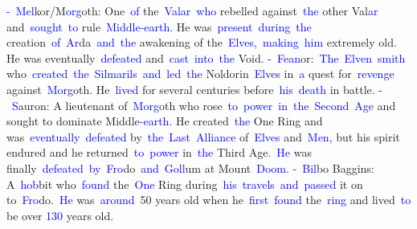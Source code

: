 \documentclass{article}
\begin{document}
\begin{tcolorbox}[colframe=black,colback=white]
{}\textcolor{blue}{-}\textcolor{blue}{~Mel}kor/M\textcolor{blue}{org}oth\textcolor{blue}{:} One\textcolor{blue}{~of} the\textcolor{blue}{~Val}\textcolor{blue}{ar}\textcolor{blue}{~who} rebelled against\textcolor{blue}{~the} other Val\textcolor{blue}{ar} and\textcolor{blue}{~sought}\textcolor{blue}{~to} rule\textcolor{blue}{~Middle}\textcolor{blue}{-earth}. He was\textcolor{blue}{~present}\textcolor{blue}{~during}\textcolor{blue}{~the} creation\textcolor{blue}{~of}\textcolor{blue}{~Ar}da\textcolor{blue}{~and}\textcolor{blue}{~the} awakening of the\textcolor{blue}{~Elves}\textcolor{blue}{,}\textcolor{blue}{~making}\textcolor{blue}{~him} extremely old. He was eventually\textcolor{blue}{~defeated} and\textcolor{blue}{~cast}\textcolor{blue}{~into}\textcolor{blue}{~the} Void\textcolor{blue}{.
}\textcolor{blue}{-}\textcolor{blue}{~Fe}\textcolor{blue}{an}or\textcolor{blue}{:}\textcolor{blue}{~The}\textcolor{blue}{~El}\textcolor{blue}{ven}\textcolor{blue}{~smith} who\textcolor{blue}{~created}\textcolor{blue}{~the}\textcolor{blue}{~Sil}\textcolor{blue}{mar}\textcolor{blue}{ils}\textcolor{blue}{~and}\textcolor{blue}{~led}\textcolor{blue}{~the} Noldorin\textcolor{blue}{~Elves} in\textcolor{blue}{~a} quest for\textcolor{blue}{~revenge} against\textcolor{blue}{~Morg}oth. He\textcolor{blue}{~lived} for several centuries before\textcolor{blue}{~his}\textcolor{blue}{~death} in battle\textcolor{blue}{.
}\textcolor{blue}{-}\textcolor{blue}{~S}auron\textcolor{blue}{:} A lieutenant of\textcolor{blue}{~Morg}oth who rose\textcolor{blue}{~to}\textcolor{blue}{~power}\textcolor{blue}{~in}\textcolor{blue}{~the}\textcolor{blue}{~Second}\textcolor{blue}{~Age} and sought to dominate Middle\textcolor{blue}{-earth}. He created\textcolor{blue}{~the} One Ring and was\textcolor{blue}{~eventually}\textcolor{blue}{~defeated} by\textcolor{blue}{~the}\textcolor{blue}{~Last}\textcolor{blue}{~Alliance} of\textcolor{blue}{~Elves} and\textcolor{blue}{~Men}\textcolor{blue}{,} but his spirit endured and he returned\textcolor{blue}{~to}\textcolor{blue}{~power} in\textcolor{blue}{~the} Third Age\textcolor{blue}{.}\textcolor{blue}{~He} was finally\textcolor{blue}{~defeated}\textcolor{blue}{~by}\textcolor{blue}{~Fro}do\textcolor{blue}{~and}\textcolor{blue}{~G}\textcolor{blue}{oll}um at Mount\textcolor{blue}{~Doom}.
\textcolor{blue}{-}\textcolor{blue}{~Bil}bo Baggins: A\textcolor{blue}{~hob}bit who\textcolor{blue}{~found} the\textcolor{blue}{~One} Ring during\textcolor{blue}{~his}\textcolor{blue}{~travels}\textcolor{blue}{~and}\textcolor{blue}{~passed} it on to\textcolor{blue}{~Fro}do.\textcolor{blue}{~He} was\textcolor{blue}{~around}\textcolor{blue}{~}50 years old when he\textcolor{blue}{~first}\textcolor{blue}{~found} the\textcolor{blue}{~ring} and lived\textcolor{blue}{~to} be over \textcolor{blue}{130} years old\textcolor{blue}{.
}
\end{tcolorbox}
\end{document}
